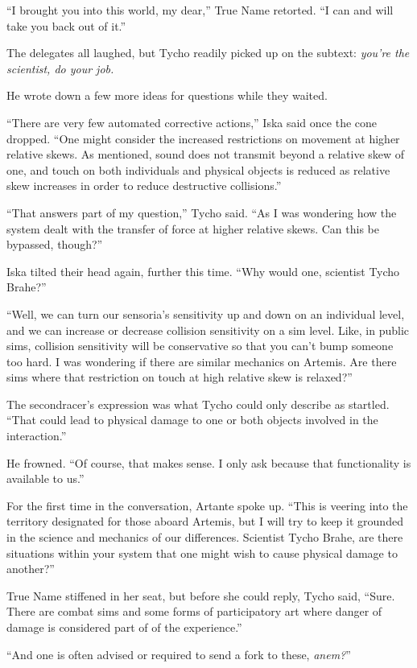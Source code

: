 ``I brought you into this world, my dear,'' True Name retorted. ``I can and will take you back out of it.''

The delegates all laughed, but Tycho readily picked up on the subtext: \emph{you're the scientist, do your job.}

He wrote down a few more ideas for questions while they waited.

``There are very few automated corrective actions,'' Iska said once the cone dropped. ``One might consider the increased restrictions on movement at higher relative skews. As mentioned, sound does not transmit beyond a relative skew of one, and touch on both individuals and physical objects is reduced as relative skew increases in order to reduce destructive collisions.''

``That answers part of my question,'' Tycho said. ``As I was wondering how the system dealt with the transfer of force at higher relative skews. Can this be bypassed, though?''

Iska tilted their head again, further this time. ``Why would one, scientist Tycho Brahe?''

``Well, we can turn our sensoria's sensitivity up and down on an individual level, and we can increase or decrease collision sensitivity on a sim level. Like, in public sims, collision sensitivity will be conservative so that you can't bump someone too hard. I was wondering if there are similar mechanics on Artemis. Are there sims where that restriction on touch at high relative skew is relaxed?''

The secondracer's expression was what Tycho could only describe as startled. ``That could lead to physical damage to one or both objects involved in the interaction.''

He frowned. ``Of course, that makes sense. I only ask because that functionality is available to us.''

For the first time in the conversation, Artante spoke up. ``This is veering into the territory designated for those aboard Artemis, but I will try to keep it grounded in the science and mechanics of our differences. Scientist Tycho Brahe, are there situations within your system that one might wish to cause physical damage to another?''

True Name stiffened in her seat, but before she could reply, Tycho said, ``Sure. There are combat sims and some forms of participatory art where danger of damage is considered part of of the experience.''

``And one is often advised or required to send a fork to these, \emph{anem?}''


